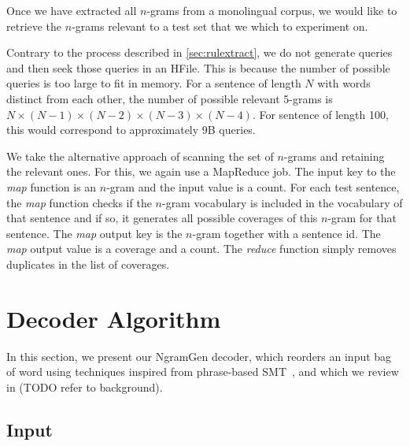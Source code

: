 Once we have extracted all $n$-grams from a monolingual corpus, we
would like to retrieve the $n$-grams relevant to a test set
that we which to experiment on.

Contrary to the process described in \autoref{sec:rulextract}, we
do not generate queries and then seek those queries in an HFile.
This is because the number of possible queries is too large
to fit in memory. For a sentence of length $N$ with words distinct
from each other, the number of possible relevant 5-grams is
$N \times (N - 1) \times (N - 2) \times (N - 3) \times (N - 4)$.
For sentence of length 100, this would correspond to approximately
9B queries.

We take the alternative approach of scanning the set of $n$-grams
and retaining the relevant ones. For this, we again use a MapReduce
job. The input key to the \emph{map} function is an $n$-gram and
the input value is a count. For each test sentence, the \emph{map}
function checks if the $n$-gram vocabulary is included in the
vocabulary of that sentence and if so, it generates all possible
coverages of this $n$-gram for that sentence. The \emph{map}
output key is the $n$-gram together with a sentence id. The \emph{map}
output value is a coverage and a count. The \emph{reduce} function
simply removes duplicates in the list of coverages. %

\section{Decoder Algorithm}
\label{sec:gyroDecoderAlgorithm}

In this section, we present our NgramGen decoder, which reorders
an input bag of word using techniques inspired from phrase-based
SMT~\citep{koehn:2010:book}, and which we review in (TODO refer to
background).

\subsection{Input}

